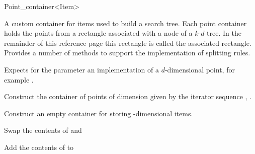 

\begin{ccRefClass}{Point_container<Item>}  %






\ccDefinition
A custom container for items used to build a search tree. Each point container
holds the points from a rectangle associated with a node of a $k$-$d$ tree.
In the remainder of this reference page this rectangle is called the
associated rectangle.
Provides a number of methods
to support the implementation of splitting rules.


\ccParameters

Expects for the parameter  an implementation of 
a $d$-dimensional point, for example .

\ccTypes



\ccCreation
{}

{
Construct the container of points of dimension 
given by the iterator sequence , .
}

{
Construct an empty container for storing -dimensional items.
}


{Swap the contents of  and }

{Add the contents of  to }


\end{ccRefClass}
